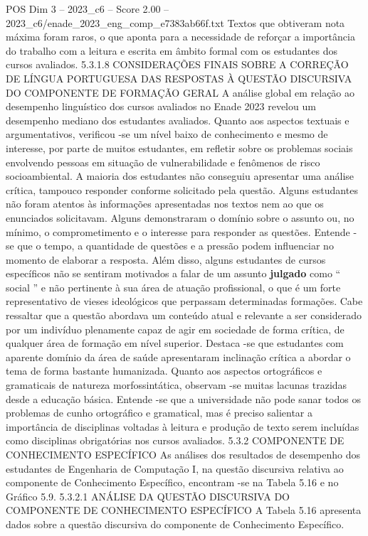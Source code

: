 \begin{textsample}{POS Dim 3 – 2023\_c6 – Score 2.00 – 2023\_c6/enade\_2023\_eng\_comp\_e7383ab66f.txt}
Textos que obtiveram nota máxima foram raros, o que aponta para a necessidade de reforçar a importância do trabalho com a leitura e escrita em âmbito formal com os estudantes dos cursos avaliados. 5.3.1.8 CONSIDERAÇÕES FINAIS SOBRE A CORREÇÃO DE LÍNGUA PORTUGUESA DAS RESPOSTAS À QUESTÃO DISCURSIVA DO COMPONENTE DE FORMAÇÃO GERAL A análise global em relação ao desempenho linguístico dos cursos avaliados no Enade 2023 revelou um desempenho mediano dos estudantes avaliados.
Quanto aos aspectos textuais e argumentativos, verificou -se um nível baixo de conhecimento e mesmo de interesse, por parte de muitos estudantes, em refletir sobre os problemas sociais envolvendo pessoas em situação de vulnerabilidade e fenômenos de risco socioambiental.
A maioria dos estudantes não conseguiu apresentar uma análise crítica, tampouco responder conforme solicitado pela questão.
Alguns estudantes não foram atentos às informações apresentadas nos textos nem ao que os enunciados solicitavam.
Alguns demonstraram o domínio sobre o assunto ou, no mínimo, o comprometimento e o interesse para responder as questões.
Entende -se que o tempo, a quantidade de questões e a pressão podem influenciar no momento de elaborar a resposta.
Além disso, alguns estudantes de cursos específicos não se sentiram motivados a falar de um assunto \textbf{julgado} como “ social ” e não pertinente à sua área de atuação profissional, o que é um forte representativo de vieses ideológicos que perpassam determinadas formações.
Cabe ressaltar que a questão abordava um conteúdo atual e relevante a ser considerado por um indivíduo plenamente capaz de agir em sociedade de forma crítica, de qualquer área de formação em nível superior.
Destaca -se que estudantes com aparente domínio da área de saúde apresentaram inclinação crítica a abordar o tema de forma bastante humanizada.
Quanto aos aspectos ortográficos e gramaticais de natureza morfossintática, observam -se muitas lacunas trazidas desde a educação básica.
Entende -se que a universidade não pode sanar todos os problemas de cunho ortográfico e gramatical, mas é preciso salientar a importância de disciplinas voltadas à leitura e produção de texto serem incluídas como disciplinas obrigatórias nos cursos avaliados. 5.3.2 COMPONENTE DE CONHECIMENTO ESPECÍFICO As análises dos resultados de desempenho dos estudantes de Engenharia de Computação I, na questão discursiva relativa ao componente de Conhecimento Específico, encontram -se na Tabela 5.16 e no Gráfico 5.9. 5.3.2.1 ANÁLISE DA QUESTÃO DISCURSIVA DO COMPONENTE DE CONHECIMENTO ESPECÍFICO A Tabela 5.16 apresenta dados sobre a questão discursiva do componente de Conhecimento Específico.

\end{textsample}
